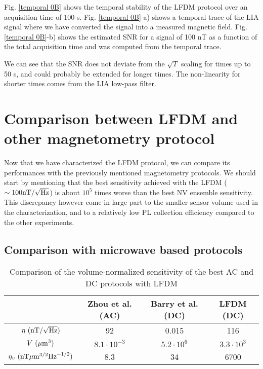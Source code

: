 \documentclass[a4paper,11pt]{report}
\begin{document}
\begin{refsection}
Fig. \ref{temporal 0B} shows the temporal stability of the LFDM protocol over an acquisition time of 100 s. Fig. \ref{temporal 0B}-a) shows a temporal trace of the LIA signal where we have converted the signal into a measured magnetic field. Fig. \ref{temporal 0B}-b) shows the estimated SNR for a signal of 100 nT as a function of the total acquisition time and was computed from the temporal trace.

We can see that the SNR does not deviate from the $\sqrt{T}$ scaling for times up to 50 s, and could probably be extended for longer times. The non-linearity for shorter times comes from the LIA low-pass filter.

\section{Comparison between LFDM and other magnetometry protocol}
Now that we have characterized the LFDM protocol, we can compare its performances with the previously mentioned magnetometry protocols. We should start by mentioning that the best sensitivity achieved with the LFDM ($\sim 100 \rm{nT} / \sqrt{\rm Hz}$) is about $10^5$ times worse than the best NV ensemble sensitivity. This discrepancy however come in large part to the smaller sensor volume used in the characterization, and to a relatively low PL collection efficiency compared to the other experiments.

\subsection{Comparison with microwave based protocols}

\begin{table}[htbp]
\centering
\caption{Comparison of the volume-normalized sensitivity of the best AC and DC protocols with LFDM}
 \label{table sensi volumiques}
\begin{tabular}{c|ccc}
\toprule
{} & Zhou et al. \citep{zhou2020quantum} (AC) & Barry et al.\citep{barry2016optical} (DC) & LFDM (DC) \\
\midrule
$\eta\ (\rm{nT} / \sqrt{\rm Hz})$ & 92&0.015& 116 \\
$V\ (\mu \rm{m}^3)$ &$8.1 \cdot 10^{-3}$ &$5.2 \cdot 10^{6}$& $3.3 \cdot 10^{3}$ \\
$\eta_v\ (\rm{nT}\mu \rm{m}^{3/2} \rm{Hz}^{-1/2})$ &8.3&34&6700 \\
\bottomrule
\end{tabular}
\end{table}


\end{refsection}
\end{document}
